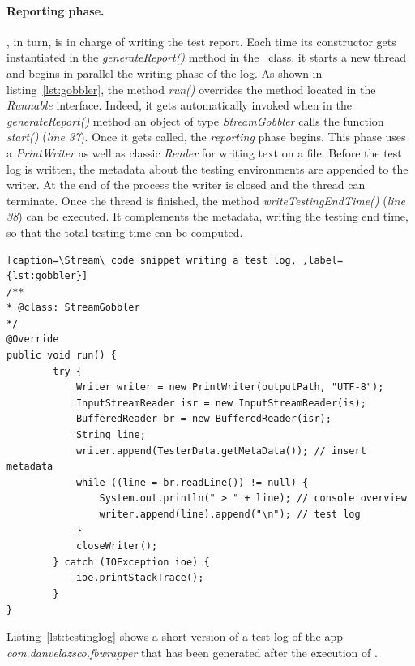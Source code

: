 \paragraph{Reporting phase.}
\Stream, in turn, is in charge of writing the test report. Each time its constructor gets instantiated in the \textit{generateReport()} method in the \Cmd\ class, it starts a new thread and begins in parallel the writing phase of the log. 
As shown in listing~\ref{lst:gobbler}, the method \textit{run()} overrides the method located in the \textit{Runnable} interface. 
Indeed, it gets automatically invoked when in the \textit{generateReport()} method an object of type \textit{StreamGobbler} calls the function \textit{start()}  (\textit{line 37}). 
Once it gets called, the \textit{reporting} phase begins. This phase uses a \textit{PrintWriter} as well as classic \textit{Reader} for writing text on a file.
Before the test log is written, the metadata about the testing environments are appended to the writer. At the end of the process the writer is closed and the thread can terminate. Once the thread is finished, the method \textit{writeTestingEndTime()} (\textit{line 38}) can be executed.  
It complements the metadata, writing the testing end time, so that the total testing time can be computed. 





\begin{lstlisting}[caption=\Stream\ code snippet writing a test log, ,label={lst:gobbler}]
/**
* @class: StreamGobbler
*/
@Override
public void run() {
        try {
            Writer writer = new PrintWriter(outputPath, "UTF-8");
            InputStreamReader isr = new InputStreamReader(is);
            BufferedReader br = new BufferedReader(isr);
            String line;
            writer.append(TesterData.getMetaData()); // insert metadata
            while ((line = br.readLine()) != null) {
                System.out.println(" > " + line); // console overview
                writer.append(line).append("\n"); // test log 
            }
            closeWriter();
        } catch (IOException ioe) {
            ioe.printStackTrace();
        }
}
\end{lstlisting}

\clearpage
\hspace{-1.5em}Listing~\ref{lst:testinglog} shows a short version of a test log of the app \textit{com.danvelazsco.fbwrapper} that has been generated after the execution of \monkey. 

